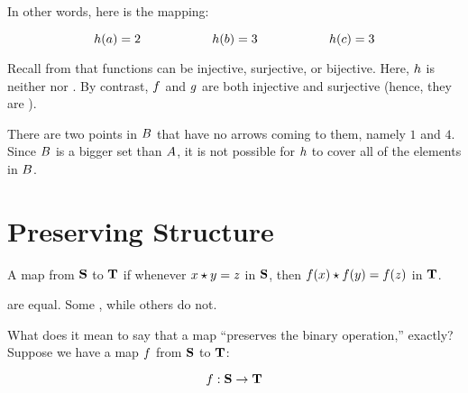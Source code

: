 \documentclass[../../../main.tex]{subfiles}
\begin{document}
\begin{example}
\begin{diagram}
\end{diagram}

In other words, here is the mapping:

\begin{equation*}
  \func{h}(a) = 2 \hskip 2cm
  \func{h}(b) = 3 \hskip 2cm
  \func{h}(c) = 3
\end{equation*}

\begin{aside}
  \begin{remark}
    Recall from  that functions can be injective, surjective, or bijective. Here, $\func{h}$ is neither  nor . By contrast, $\func{f}$ and $\func{g}$ are both injective and surjective (hence, they are ).
  \end{remark}
\end{aside}

There are two points in $\set{B}$ that have no arrows coming to them, namely $1$ and $4$. Since $\set{B}$ is a bigger set than $\set{A}$, it is not possible for $\func{h}$ to cover all of the elements in $\set{B}$. 

\end{example}


\section{Preserving Structure}

\begin{terminology}
  A map from $\algebra{S}$ to $\algebra{T}$  if whenever $\op{x}{y} = z$ in $\algebra{S}$, then $\op{\func{f}(x)}{\func{f}(y)} = \func{f}(z)$ in $\algebra{T}$.
\end{terminology}

 are equal. Some , while others do not. 

What does it mean to say that a map ``preserves the binary operation,'' exactly? Suppose we have a map $\func{f}$ from $\algebra{S}$ to $\algebra{T}$:

\begin{equation*}
  \funcsig{f}{\algebra{S}}{\algebra{T}}
\end{equation*}
\end{document}
